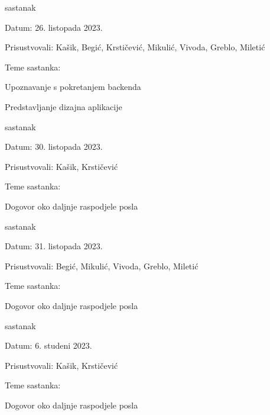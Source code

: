 \begin{packed_enum}
            \item  sastanak
			\item[] \begin{packed_item}
				\item Datum: 26. listopada 2023.
				\item Prisustvovali: Kašik, Begić, Krstičević, Mikulić, Vivoda, Greblo, Miletić
				\item Teme sastanka:
				\begin{packed_item}
					\item  Upoznavanje s pokretanjem backenda
                    \item  Predstavljanje dizajna aplikacije
				\end{packed_item}
			\end{packed_item}

            \item  sastanak
			\item[] \begin{packed_item}
				\item Datum: 30. listopada 2023.
				\item Prisustvovali: Kašik, Krstičević
				\item Teme sastanka:
				\begin{packed_item}
					\item  Dogovor oko daljnje raspodjele posla
				\end{packed_item}
			\end{packed_item}

            \item  sastanak
			\item[] \begin{packed_item}
				\item Datum: 31. listopada 2023.
				\item Prisustvovali: Begić, Mikulić, Vivoda, Greblo, Miletić
				\item Teme sastanka:
				\begin{packed_item}
					\item  Dogovor oko daljnje raspodjele posla
				\end{packed_item}
			\end{packed_item}

            \item  sastanak
			\item[] \begin{packed_item}
				\item Datum: 6. studeni 2023.
				\item Prisustvovali: Kašik, Krstičević
				\item Teme sastanka:
				\begin{packed_item}
					\item  Dogovor oko daljnje raspodjele posla
				\end{packed_item}
			\end{packed_item}


\end{packed_enum}

